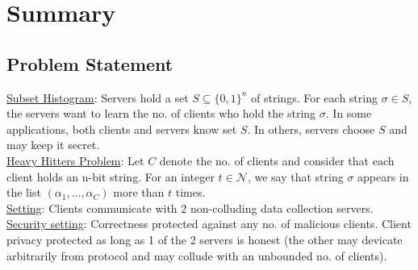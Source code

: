 
\clearpage
{}

%
\setcounter{section}{0} %

\section{Summary}
\subsection{Problem Statement}

\underline{Subset Histogram}: Servers hold a set $S \subseteq \{0, 1\}^n$ of strings. For each string $\sigma \in S$, the servers want to learn the no. of clients who hold the string $\sigma$. In some applications, both clients and servers know set $S$. In others, servers choose $S$ and may keep it secret. \\

\noindent \underline{Heavy Hitters Problem}: Let $C$ denote the no. of clients and consider that each client holds an n-bit string. For an integer $t \in \mathcal{N}$, we say that string $\sigma$ appears in the list $(\alpha_1, ..., \alpha_C)$ more than $t$ times.\\

\noindent \underline{Setting}: Clients communicate with 2 non-colluding data collection servers. \\

\noindent \underline{Security setting}: Correctness protected against any no. of malicious clients. Client privacy protected as long as 1 of the 2 servers is honest (the other may devicate arbitrarily from protocol and may collude with an unbounded no. of clients). \\

